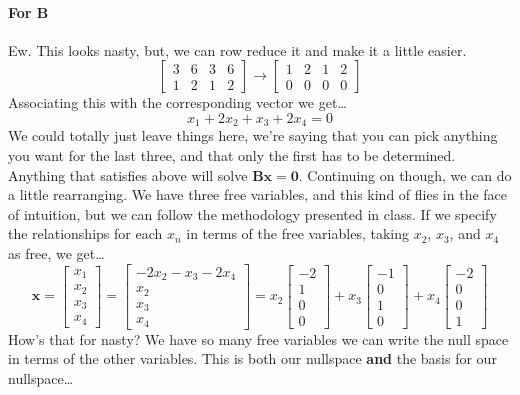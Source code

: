 \documentclass{article}
\begin{document}
            \paragraph{For $\mathbf{B}$}
                Ew. This looks nasty, but, we can row reduce it and make it a little easier.
                \[
                    \begin{bmatrix}3&6&3&6\\1&2&1&2\end{bmatrix}
                    \rightarrow
                    \begin{bmatrix}1&2&1&2\\0&0&0&0\end{bmatrix}
                \]
                Associating this with the corresponding vector we get\dots
                \[
                    x_1+2x_2+x_3+2x_4=0
                \]
                We could totally just leave things here, we're saying that you can pick
                anything you want for the last three, and that only the first has to be determined.
                Anything that satisfies above will solve $\mathbf{Bx}=\mathbf{0}$.
                Continuing on though, we can do a little rearranging.
                We have three free variables, and this kind of flies in the face of intuition,
                but we can follow the methodology presented in class. If we specify the relationships for each $x_n$
                in terms of the free variables, taking $x_2$, $x_3$, and $x_4$ as free, we get\dots
                \[
                    \mathbf{x}
                    =
                    \begin{bmatrix}x_1\\x_2\\x_3\\x_4\end{bmatrix}
                    =
                    \begin{bmatrix}-2x_2-x_3-2x_4\\x_2\\x_3\\x_4\end{bmatrix}
                    =
                        x_2\begin{bmatrix}-2\\1\\0\\0\end{bmatrix}
                        +
                        x_3\begin{bmatrix}-1\\0\\1\\0\end{bmatrix}
                        +
                        x_4\begin{bmatrix}-2\\0\\0\\1\end{bmatrix}
                \]
                How's that for nasty? We have so many free variables we can write
                the null space in terms of the other variables. This is both our nullspace
                \textbf{and} the basis for our nullspace\dots
\end{document}
